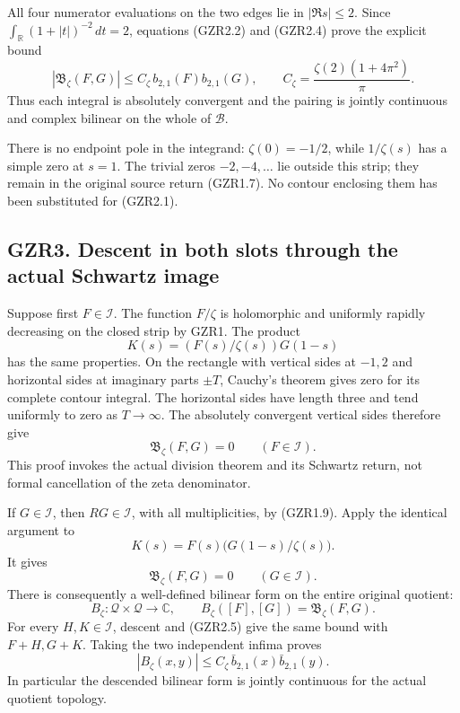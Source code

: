 All four numerator evaluations on the two edges lie in \(|\Re s|\le2\).
Since \(\int_{\mathbb R}(1+|t|)^{-2}\,dt=2\), equations (GZR2.2) and
(GZR2.4) prove the explicit bound \[
|\mathfrak B_\zeta(F,G)|
\le C_\zeta\, b_{2,1}(F)b_{2,1}(G),
\qquad
C_\zeta=\frac{\zeta(2)(1+4\pi^2)}{\pi}.
\tag{GZR2.5}
\] Thus each integral is absolutely convergent and the pairing is
jointly continuous and complex bilinear on the whole of \(\mathcal B\).

There is no endpoint pole in the integrand: \(\zeta(0)=-1/2\), while
\(1/\zeta(s)\) has a simple zero at \(s=1\). The trivial zeros
\(-2,-4,\ldots\) lie outside this strip; they remain in the original
source return (GZR1.7). No contour enclosing them has been substituted
for (GZR2.1).

\subsection{GZR3. Descent in both slots through the actual Schwartz
image}\label{gzr3.-descent-in-both-slots-through-the-actual-schwartz-image}

Suppose first \(F\in\mathcal I\). The function \(F/\zeta\) is
holomorphic and uniformly rapidly decreasing on the closed strip by
GZR1. The product \[
K(s)=(F(s)/\zeta(s))G(1-s)
\] has the same properties. On the rectangle with vertical sides at
\(-1,2\) and horizontal sides at imaginary parts \(\pm T\), Cauchy's
theorem gives zero for its complete contour integral. The horizontal
sides have length three and tend uniformly to zero as \(T\to\infty\).
The absolutely convergent vertical sides therefore give \[
\mathfrak B_\zeta(F,G)=0\qquad(F\in\mathcal I).
\tag{GZR3.1}
\] This proof invokes the actual division theorem and its Schwartz
return, not formal cancellation of the zeta denominator.

If \(G\in\mathcal I\), then \(RG\in\mathcal I\), with all
multiplicities, by (GZR1.9). Apply the identical argument to \[
K(s)=F(s)\bigl(G(1-s)/\zeta(s)\bigr).
\] It gives \[
\mathfrak B_\zeta(F,G)=0\qquad(G\in\mathcal I).
\tag{GZR3.2}
\] There is consequently a well-defined bilinear form on the entire
original quotient: \[
B_\zeta:\mathcal Q\times\mathcal Q\longrightarrow\mathbb C,
\qquad B_\zeta([F],[G])=\mathfrak B_\zeta(F,G).
\tag{GZR3.3}
\] For every \(H,K\in\mathcal I\), descent and (GZR2.5) give the same
bound with \(F+H,G+K\). Taking the two independent infima proves \[
|B_\zeta(x,y)|
\le C_\zeta\,\bar b_{2,1}(x)\bar b_{2,1}(y).
\tag{GZR3.4}
\] In particular the descended bilinear form is jointly continuous for
the actual quotient topology.

